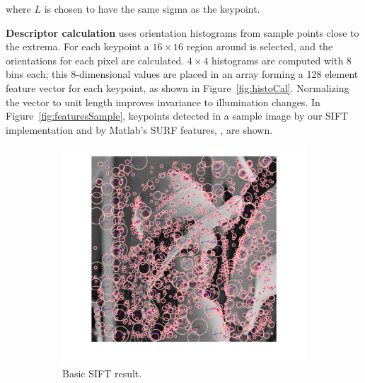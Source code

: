 \documentclass[12pt]{article}
\begin{document}
where $L$ is chosen to have the same sigma as the keypoint.

\textbf{Descriptor calculation} uses orientation histograms from sample points close to the extrema.
For each keypoint a $16 \times 16$ region around is selected, and the orientations for each pixel are calculated.
$4 \times 4$ histograms are computed with 8 bins each; this 8-dimensional values are placed in an array forming a 128 element feature vector for each keypoint, as shown in Figure~\ref{fig:histoCal}.
Normalizing the vector to unit length improves invariance to illumination changes.
In Figure~\ref{fig:featuresSample}, keypoints detected in a sample image by our SIFT implementation and by Matlab's SURF features, \cite{Bay2006}, are shown.

\begin{figure}[htbp!]
        \centering
        \begin{subfigure}[b]{0.49\textwidth}
                \includegraphics[width=\textwidth]{images/sift2}
                \caption{Basic SIFT result.}
                \label{fig:sift1}
        \end{subfigure}
        \begin{subfigure}[b]{0.49\textwidth}

\end{subfigure}
\end{figure}
\end{document}
